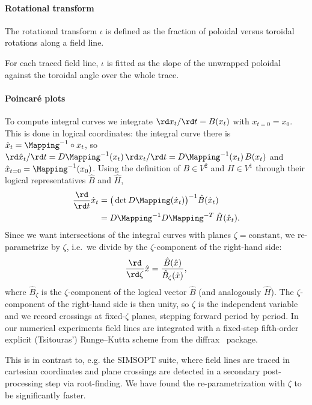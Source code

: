 \documentclass[%
 reprint,
 superscriptaddress,
 amsmath,amssymb,
 aps, nofootinbib, floatfix]{revtex4-2}
\begin{document}
\paragraph{Rotational transform}
The rotational transform $\iota$ is defined as the fraction of poloidal versus toroidal rotations along a field line. 

For each traced field line, $\iota$ is fitted as the slope of the unwrapped poloidal against the toroidal angle over the whole trace.


\paragraph{Poincaré plots}
To compute integral curves we integrate $\rd x_t / \rd t = B(x_t)$ with $x_{t=0} = x_0$. This is done in logical coordinates: the integral curve there is $\hat x_t = \Mapping^{-1} \circ x_t$, so $\rd \hat x_t / \rd t = D\Mapping^{-1}(x_t)\, \rd x_t / \rd t = D\Mapping^{-1}(x_t)\, B(x_t)$ and $\hat x_{t=0} = \Mapping^{-1}(x_0)$. Using the definition of $B \in V^2$ and $H \in V^1$ through their logical representatives $\hat B$ and $\hat H$,
\begin{align}
    \frac{\rd }{\rd t} \hat x_t
    &= \big( \det D\Mapping(\hat x_t) \big)^{-1} \hat B(\hat x_t)
    \\ &= D\Mapping^{-1} D\Mapping^{-T}\, \hat H(\hat x_t).
    \notag
\end{align}
Since we want intersections of the integral curves with planes $\zeta = \mathrm{constant}$, we re-parametrize by $\zeta$, i.e.\ we divide by the $\zeta$-component of the right-hand side:
\begin{align}
    \frac{\rd }{\rd \zeta} \hat x = \frac{\hat B(\hat x)}{\hat B_{\zeta}(\hat x)},
\end{align}
where $\hat B_{\zeta}$ is the $\zeta$-component of the logical vector $\hat B$ (and analogously $\hat H$).
The $\zeta$-component of the right-hand side is then unity, so $\zeta$ is the independent variable and we record crossings at fixed-$\zeta$ planes, stepping forward period by period. In our numerical experiments field lines are integrated with a fixed-step fifth-order explicit (Tsitouras') Runge--Kutta scheme from the {diffrax}~\citep{kidger_neural_2022} package.

\begin{remark}
    This is in contrast to, e.g. the SIMSOPT suite, where field lines are traced in cartesian coordinates and plane crossings are detected in a secondary post-processing step via root-finding. We have found the re-parametrization with $\zeta$ to be significantly faster.
\end{remark}
\end{document}
